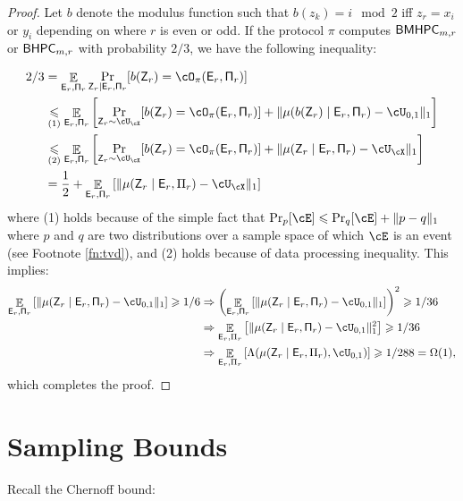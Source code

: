 \documentclass[11pt,letterpaper]{article}
\DeclareMathOperator*{\E}{\mathbb{E}}
\renewcommand{\geq}{\geqslant}
\renewcommand{\leq}{\leqslant}
\theoremstyle{definition}
\newcommand{\rPi}{\rv{\Pi}}
\newcommand{\bhpc}{\ensuremath{\textnormal{\textsf{BHPC}}}\xspace}
\newcommand{\bmhpc}{\ensuremath{\textnormal{\textsf{BMHPC}}}\xspace}
\newcommand{\rv}[1]{\ensuremath{\mathsf{#1}}}
\newcommand{\rZ}{\rv{Z}}
\newcommand{\rE}{\rv{E}}
\begin{document}
\begin{proof}
    
 Let $b$ denote the modulus function such that $b(z_k) = i \mod 2$ iff $z_r = x_i$ or $y_i$ depending on where $r$ is even or odd. If the protocol $\pi$ computes $\bmhpc_{m,r}$ or $\bhpc_{m,r}$ with probability $2/3$, we have the following inequality:

 \begin{align*}
     2/3 &= \E_{\rE_r,\rPi_r} \Pr_{\rZ_r \mid \rE_r,\rPi_r} [b(\rZ_r) =
     \cO_\pi(\rE_r,\rPi_r)]\\
     &\underset{(1)}\leq \E_{\rE_r,\rPi_r}\left[\Pr_{\rZ_r \sim
     \cU_{\cX}}[b(\rZ_r) = \cO_\pi(\rE_r,\rPi_r)] + \|\mu(b(\rZ_r) \mid \rE_r,\rPi_r) - \cU_{0,1}\|_1 \right]\\
     &\underset{(2)}\leq \E_{\rE_r,\rPi_r}\left[\Pr_{\rZ_r \sim
     \cU_{\cX}}[b(\rZ_r) = \cO_\pi(\rE_r,\rPi_r)] + \|\mu(\rZ_r \mid \rE_r,\rPi_r) - \cU_\cX\|_1 \right]\\
     &= \frac 1 2 + \E_{\rE_r,\rPi_r}\left[\|\mu(\rZ_r \mid \rE_r,\Pi_r) - \cU_\cX\|_1 \right]
 \end{align*}
 where (1) holds because of the simple fact that $\Pr_p[\cE] \leq \Pr_q[\cE] + \|p-q\|_1$ where $p$ and $q$ are two distributions over a sample space of which $\cE$ is an event (see Footnote \ref{fn:tvd}), and (2) holds because of data processing inequality. This implies:
 \begin{align*}
     \E_{\rE_r,\rPi_r}\left[\|\mu(\rZ_r \mid \rE_r,\rPi_r) - \cU_{0,1}\|_1
     \right] \geq 1/6 &\Rightarrow \left(\E_{\rE_r,\rPi_r}\left[\|\mu(\rZ_r \mid
     \rE_r,\rPi_r) - \cU_{0,1}\|_1 \right] \right)^2\geq 1/36\\
     &\Rightarrow \E_{\rE_r,\Pi_r}\left[\|\mu(\rZ_r \mid \rE_r,\rPi_r) -
     \cU_{0,1}\|_1^2 \right] \geq 1/36\\
     &\Rightarrow \E_{\rE_r,\Pi_r}
     \left[\Lambda(\mu(\rZ_r \mid \rE_r,\Pi_r), \cU_{0,1}) \right]
     \geq 1/288 = \Omega(1),
 \end{align*}
 which completes the proof.
\end{proof}




\appendix

\section{Sampling Bounds}\label{sec:sampling}

Recall the Chernoff bound:
\end{document}
